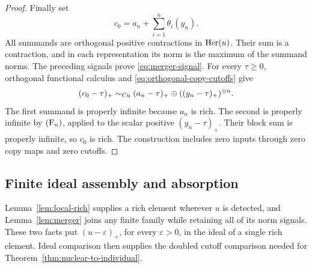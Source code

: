 \begin{proof}
Finally set
\[
 c_0=a_n+\sum_{i=1}^{n}\theta_i(y_n).
\]
All summands are orthogonal positive contractions in \(\operatorname{Her}(u)\).
Their sum is a contraction, and in each representation its norm is
the maximum of the summand norms.  The preceding signals prove
\eqref{eq:merger-signal}.  For every \(\tau\ge0\), orthogonal
functional calculus and \eqref{eq:orthogonal-copy-cutoffs} give
\[
 (c_0-\tau)_+
 \sim_{\mathrm{Cu}}(a_n-\tau)_+\oplus((y_n-\tau)_+)^{\oplus n}.
\]
The first summand is properly infinite because \(a_n\) is rich.
The second is properly infinite by \(\textup{(F\ensuremath{_n})}\), applied to the
scalar positive \((y_n-\tau)_+\).  Their block sum is properly
infinite, so \(c_0\) is rich.  The construction includes zero
inputs through zero copy maps and zero cutoffs.
\end{proof}

\subsection{Finite ideal assembly and absorption}

Lemma~\ref{lem:local-rich} supplies a rich element wherever \(u\) is
detected, and Lemma~\ref{lem:merger} joins any finite family while
retaining all of its norm signals.  These two facts put
\((u-\varepsilon)_+\), for every \(\varepsilon>0\), in the ideal of
a single rich element.  Ideal comparison then supplies the doubled
cutoff comparison needed for Theorem~\ref{thm:nuclear-to-individual}.

